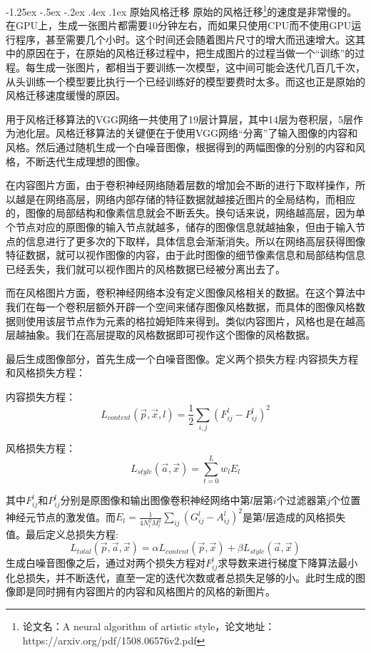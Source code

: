 \documentclass[a4paper, 11pt]{article}
\makeatletter
\newcommand{\xiaosihao}{\fontsize{12pt}{\baselineskip}\selectfont}
\renewcommand\subsection{\@startsection{subsection}{1}{\z@}%
{-1.25ex \@plus -.5ex \@minus -.2ex}%
{.4ex \@plus .1ex}%
{\normalfont\xiaosihao\CJKfamily{hei}}}
\makeatother
\begin{document}
\subsection{原始风格迁移}
原始的风格迁移\footnote{论文名：A neural algorithm of artistic style，论文地址：https://arxiv.org/pdf/1508.06576v2.pdf}的速度是非常慢的。在GPU上，生成一张图片都需要10分钟左右，而如果只使用CPU而不使用GPU运行程序，甚至需要几个小时。这个时间还会随着图片尺寸的增大而迅速增大。这其中的原因在于，在原始的风格迁移过程中，把生成图片的过程当做一个“训练”的过程。每生成一张图片，都相当于要训练一次模型，这中间可能会迭代几百几千次，从头训练一个模型要比执行一个已经训练好的模型要费时太多。而这也正是原始的风格迁移速度缓慢的原因。

用于风格迁移算法的VGG网络一共使用了19层计算层，其中14层为卷积层，5层作为池化层。风格迁移算法的关键便在于使用VGG网络“分离”了输入图像的内容和风格。然后通过随机生成一个白噪音图像，根据得到的两幅图像的分别的内容和风格，不断迭代生成理想的图像。

在内容图片方面，由于卷积神经网络随着层数的增加会不断的进行下取样操作，所以越是在网络高层，网络内部存储的特征数据就越接近图片的全局结构，而相应的，图像的局部结构和像素信息就会不断丢失。换句话来说，网络越高层，因为单个节点对应的原图像的输入节点就越多，储存的图像信息就越抽象，但由于输入节点的信息进行了更多次的下取样，具体信息会渐渐消失。所以在网络高层获得图像特征数据，就可以视作图像的内容，由于此时图像的细节像素信息和局部结构信息已经丢失，我们就可以视作图片的风格数据已经被分离出去了。

而在风格图片方面，卷积神经网络本没有定义图像风格相关的数据。在这个算法中我们在每一个卷积层额外开辟一个空间来储存图像风格数据，而具体的图像风格数据则使用该层节点作为元素的格拉姆矩阵来得到。类似内容图片，风格也是在越高层越抽象。我们在高层提取的风格数据即可视作这个图像的风格数据。

最后生成图像部分，首先生成一个白噪音图像。定义两个损失方程:内容损失方程和风格损失方程：

内容损失方程：
\begin{equation}
L_{content}(\vec{p},\vec{x},l)=\frac{1}{2}\sum_{i,j}(F_{ij}^{l}-P_{ij}^{l})^2
\end{equation}

风格损失方程：
\begin{equation}
L_{style}(\vec{a},\vec{x})=\sum_{t=0}^{L}w_lE_l
\end{equation}

其中$F_{ij}^{l}$和$P_{ij}^{l}$分别是原图像和输出图像卷积神经网络中第$l$层第$i$个过滤器第$j$个位置神经元节点的激发值。而$E_l=\frac{1}{4N_l^2M_l^2}\sum_{ij}(G_{ij}^{l}-A_{ij}^{l})^2$是第$l$层造成的风格损失值。最后定义总损失方程:
\begin{equation}
L_{total}(\vec{p},\vec{a},\vec{x})=\alpha L_{content}(\vec{p},\vec{x})+\beta L_{style}(\vec{a},\vec{x})
\end{equation}
生成白噪音图像之后，通过对两个损失方程对$F_{ij}^{l}$求导数来进行梯度下降算法最小化总损失，并不断迭代，直至一定的迭代次数或者总损失足够的小。此时生成的图像即是同时拥有内容图片的内容和风格图片的风格的新图片。
\end{document}
